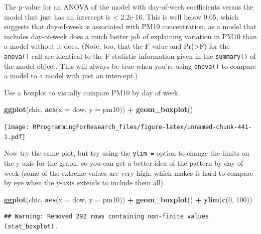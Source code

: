 \documentclass[]{book}
\makeatletter
\newenvironment{Shaded}{\begin{snugshade}}{\end{snugshade}}
\newcommand{\KeywordTok}[1]{\textcolor[rgb]{0.13,0.29,0.53}{\textbf{#1}}}
\newcommand{\DataTypeTok}[1]{\textcolor[rgb]{0.13,0.29,0.53}{#1}}
\newcommand{\DecValTok}[1]{\textcolor[rgb]{0.00,0.00,0.81}{#1}}
\newcommand{\StringTok}[1]{\textcolor[rgb]{0.31,0.60,0.02}{#1}}
\newcommand{\OperatorTok}[1]{\textcolor[rgb]{0.81,0.36,0.00}{\textbf{#1}}}
\newcommand{\NormalTok}[1]{#1}
\newenvironment{kframe}{%
\medskip{}
\setlength{\fboxsep}{.8em}
 \def\at@end@of@kframe{}%
 \ifinner\ifhmode%
  \def\at@end@of@kframe{\end{minipage}}%
  \begin{minipage}{\columnwidth}%
 \fi\fi%
 \def\FrameCommand##1{\hskip\@totalleftmargin \hskip-\fboxsep
 \colorbox{shadecolor}{##1}\hskip-\fboxsep
     \hskip-\linewidth \hskip-\@totalleftmargin \hskip\columnwidth}%
 \MakeFramed {\advance\hsize-\width
   \@totalleftmargin\z@ \linewidth\hsize
   \@setminipage}}%
 {\par\unskip\endMakeFramed%
 \at@end@of@kframe}
\renewenvironment{Shaded}{\begin{kframe}}{\end{kframe}}
\theoremstyle{definition}
\theoremstyle{definition}
\theoremstyle{definition}
\theoremstyle{remark}
\makeatother
\begin{document}
The p-value for an ANOVA of the model with day-of-week coefficients
versus the model that just has an intercept is \textless{} 2.2e-16. This
is well below 0.05, which suggests that day-of-week is associated with
PM10 concentration, as a model that includes day-of-week does a much
better job of explaining variation in PM10 than a model without it does.
(Note, too, that the F value and Pr(\textgreater{}F) for the
\texttt{anova()} call are identical to the F-statistic information given
in the \texttt{summary()} of the model object. This will always be true
when you're using \texttt{anova()} to compare a model to a model with
just an intercept.)

Use a boxplot to visually compare PM10 by day of week.

\begin{Shaded}
\begin{Highlighting}[]
\KeywordTok{ggplot}\NormalTok{(chic, }\KeywordTok{aes}\NormalTok{(}\DataTypeTok{x =}\NormalTok{ dow, }\DataTypeTok{y =}\NormalTok{ pm10)) }\OperatorTok{+}\StringTok{ }
\StringTok{  }\KeywordTok{geom_boxplot}\NormalTok{()}
\end{Highlighting}
\end{Shaded}

\texttt{[image: RProgrammingForResearch\_files/figure-latex/unnamed-chunk-441-1.pdf]}

Now try the same plot, but try using the \texttt{ylim\ =} option to
change the limits on the y-axis for the graph, so you can get a better
idea of the pattern by day of week (some of the extreme values are very
high, which makes it hard to compare by eye when the y-axis extends to
include them all).

\begin{Shaded}
\begin{Highlighting}[]
\KeywordTok{ggplot}\NormalTok{(chic, }\KeywordTok{aes}\NormalTok{(}\DataTypeTok{x =}\NormalTok{ dow, }\DataTypeTok{y =}\NormalTok{ pm10)) }\OperatorTok{+}\StringTok{ }
\StringTok{  }\KeywordTok{geom_boxplot}\NormalTok{() }\OperatorTok{+}\StringTok{ }
\StringTok{  }\KeywordTok{ylim}\NormalTok{(}\KeywordTok{c}\NormalTok{(}\DecValTok{0}\NormalTok{, }\DecValTok{100}\NormalTok{))}
\end{Highlighting}
\end{Shaded}

\begin{verbatim}
## Warning: Removed 292 rows containing non-finite values (stat_boxplot).
\end{verbatim}
\end{document}
